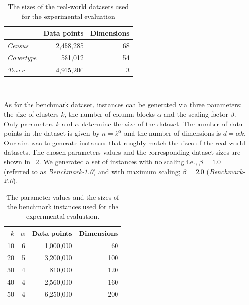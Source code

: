 %
\begin{table}
	\begin{center}%
	\caption{The sizes of the real-world datasets used for the experimental evaluation}
	\label{tab:real-world-datasets-overview}
	\begin{tabular}{lrr}
		\toprule
        
		    & Data points
		    & Dimensions
            \\
		\midrule
		\textit{Census}
    		& 2,458,285
    		& 68
    		\\
	    \textit{Covertype}
    	    & 581,012
    		& 54
    		\\
        \textit{Tover}
            & 4,915,200
    		& 3
    		\\
		\bottomrule
	\end{tabular}\\
	\end{center}
\end{table}

As for the benchmark dataset, instances can be generated via three parameters; the size of clusters $k$, the number of column blocks $\alpha$ and the scaling factor $\beta$. Only parameters $k$ and $\alpha$ determine the size of the dataset. The number of data points in the dataset is given by $n=k^{\alpha}$ and the number of dimensions is $d=\alpha k$. Our aim was to generate instances that roughly match the sizes of the real-world datasets. The chosen parameters values and the corresponding dataset sizes are shown in ~\cref{tab:benchmark-instances-overview}. We generated a set of instances with no scaling i.e., $\beta=1.0$ (referred to as \textit{Benchmark-1.0}) and with maximum scaling; $\beta = 2.0$ (\textit{Benchmark-2.0}).



%
\begin{table}
	\begin{center}%
	\caption{The parameter values and the sizes of the benchmark instances used for the experimental evaluation.}
	\label{tab:benchmark-instances-overview}
	\begin{tabular}{rrrr}
		\toprule
        $k$
		    & $\alpha$
		    & Data points
		    & Dimensions
            \\
		\midrule
        10
    		& 6
    		& 1,000,000
    		& 60
    		\\
        20
    		& 5
    		& 3,200,000
    		& 100
    		\\
        30
    		& 4
    		& 810,000
    		& 120
    		\\
        40
    		& 4
    		& 2,560,000
    		& 160
    		\\
        50
    		& 4
    		& 6,250,000
    		& 200
    		\\
		\bottomrule
	\end{tabular}\\
	\end{center}
\end{table}

